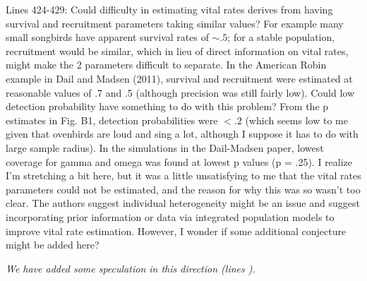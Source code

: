 \documentclass[12pt,english]{article}
\begin{document}
\begin{spacing}{1.9}
\begin{flushleft}
Lines 424-429: Could difficulty in estimating vital rates derives from having
survival and recruitment parameters taking similar values? For example many
small songbirds have apparent survival rates of $\sim .5$; for a stable population,
recruitment would be similar, which in lieu of direct information on vital
rates, might make the 2 parameters difficult to separate. In the American Robin
example in Dail and Madsen (2011), survival and recruitment were estimated at
reasonable values of .7 and .5 (although precision was still fairly low). Could
low detection probability have something to do with this problem? From the p
estimates in Fig. B1, detection probabilities were $< .2$ (which seems low to me
given that ovenbirds are loud and sing a lot, although I suppose it has to do
with large sample radius). In the simulations in the Dail-Madsen paper, lowest
coverage for gamma and omega was found at lowest p values (p = .25). I realize
I'm stretching a bit here, but it was a little
unsatisfying to me that the vital rates parameters could not be estimated, and
the reason for why this was so wasn't too clear. The authors suggest individual
heterogeneity might be an issue and suggest incorporating prior information or
data via integrated population models to improve vital rate estimation. However,
I wonder if some additional conjecture might be added here?

\vspace{0.5cm}
\textit{We have added some speculation in this direction (lines ).}
\vspace{0.5cm}




\end{flushleft}
\end{spacing}
\end{document}
